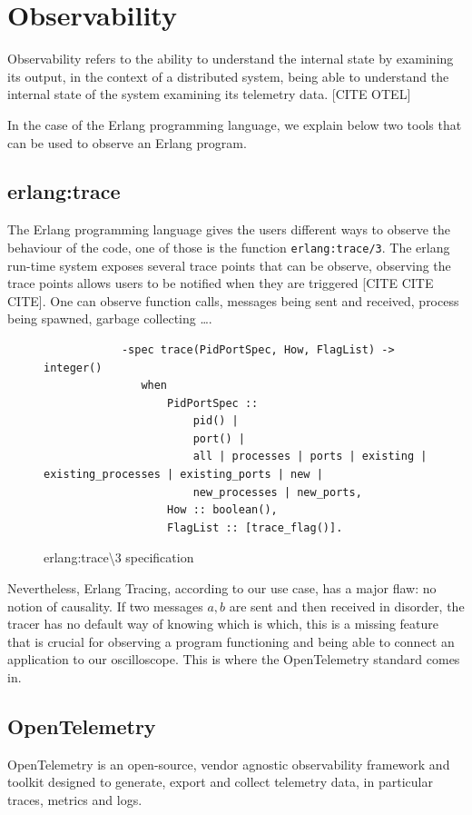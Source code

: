 \section{Observability}
        Observability refers to the ability to understand the internal state by examining its output, in the context of a distributed system, being able to understand the internal state of the system examining its telemetry data. [CITE OTEL]

    In the case of the Erlang programming language, we explain below two tools that can be used to observe an Erlang program.
    
    \subsection{erlang:trace}
        The Erlang programming language gives the users different ways to observe the behaviour of the code, one of those is the function \texttt{erlang:trace/3}. The erlang run-time system exposes several trace points that can be observe, observing the trace points allows users to be notified when they are triggered [CITE CITE CITE]. One can observe function calls, messages being sent and received, process being spawned, garbage collecting \dots. 
        \begin{figure}[!ht]
        \centering
        \begin{verbatim}
            -spec trace(PidPortSpec, How, FlagList) -> integer()
               when
                   PidPortSpec ::
                       pid() |
                       port() |
                       all | processes | ports | existing | existing_processes | existing_ports | new |
                       new_processes | new_ports,
                   How :: boolean(),
                   FlagList :: [trace_flag()].
        \end{verbatim}
        \caption{erlang:trace\textbackslash3 specification}
\end{figure}

    Nevertheless, Erlang Tracing, according to our use case, has a major flaw: no notion of causality. If two messages $a, b$ are sent and then received in disorder, the tracer has no default way of knowing which is which, this is a missing feature that is crucial for observing a program functioning and being able to connect an application to our oscilloscope.  This is where the OpenTelemetry standard comes in.

\subsection{OpenTelemetry}
    OpenTelemetry is an open-source, vendor agnostic observability framework and toolkit designed to generate, export and collect telemetry data, in particular traces, metrics and logs. 

